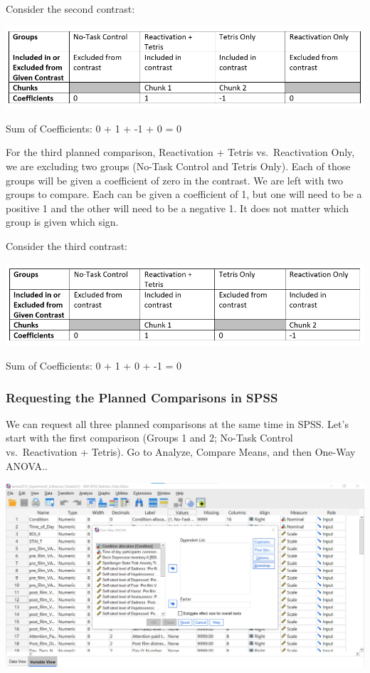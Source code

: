 \documentclass[
]{book}
\begin{document}
Consider the second contrast:

\includegraphics{img/8.6.3.20.png}

Sum of Coefficients: 0 + 1 + -1 + 0 = 0

For the third planned comparison, Reactivation + Tetris vs.~Reactivation Only, we are excluding two groups (No-Task Control and Tetris Only). Each of those groups will be given a coefficient of zero in the contrast. We are left with two groups to compare. Each can be given a coefficient of 1, but one will need to be a positive 1 and the other will need to be a negative 1. It does not matter which group is given which sign.

Consider the third contrast:

\includegraphics{img/8.6.3.21.png}

Sum of Coefficients: 0 + 1 + 0 + -1 = 0

\hypertarget{requesting-the-planned-comparisons-in-spss}{%
\subsubsection{Requesting the Planned Comparisons in SPSS}\label{requesting-the-planned-comparisons-in-spss}}

We can request all three planned comparisons at the same time in SPSS. Let's start with the first comparison (Groups 1 and 2; No-Task Control vs.~Reactivation + Tetris). Go to {Analyze}, {Compare Means}, and then {One-Way ANOVA.}.

\includegraphics{img/8.6.4.22.png}
\end{document}
